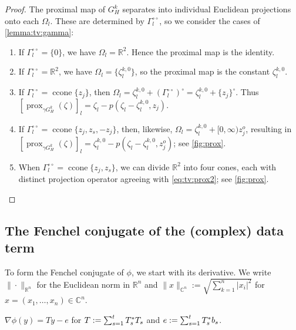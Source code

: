 \documentclass[a4paper,english]{jnsao}
\theoremstyle{definition}
\numberwithin{algorithm}{section}
\newcommand{\cj}[1]{\{ #1\}}
\newcommand{\proxold}[2]{\prox_{#1}(#2)}
\DeclareMathOperator{\prox}{prox}
\newcommand{\rea}[1]{\mathbb{R}^{#1}}
\def\norm#1{\|#1\|}
\def\defeq{:=}
\def\R{\mathbb{R}}
\def\C{\mathbb{C}}
\DeclareMathOperator{\ccone}{ccone}
\let\Re\relax\DeclareMathOperator{\Re}{Re}
\newcommand{\freevar}{\,\boldsymbol\cdot\,}
\def\abs#1{|#1|}
\def\polar#1{#1^\circ}
\def\bipolar#1{#1^{\circ\circ}}
\def\ortho{o}
\begin{document}
\begin{proof}
    The proximal map of $G_H^k$ separates into individual Euclidean projections onto each $\Omega_l$.
    These are determined by $\bipolar \Gamma_l$, so we consider the cases of \cref{lemma:tv:gamma}:
    \begin{enumerate}[label=(\alph*)]
        \item
        If $\bipolar \Gamma_l = \cj{0}$, we have $\Omega_l = \rea{2}$.
        Hence the proximal map is the identity.

        \item
        If $\bipolar \Gamma _l = \rea{2}$, we have $\Omega _l = \cj{\zeta _l^{k,0}}$, so the proximal map is the constant $\zeta _l^{k,0}$.

        \item
        If $\bipolar \Gamma_l = \ccone\cj{z_{j}}$, then
        $
            \Omega _l
             = \zeta_l^{k,0} + \polar{(\bipolar \Gamma_l)}
             = \zeta_l^{k,0} + \polar{\{z_j\}}.
        $
        Thus $[\proxold{\gamma G_H^k}{\zeta}]_l = \zeta _ l -p(\zeta _l - \zeta _l^{k,0},z_{j})$.

        \item
        If $\bipolar \Gamma _l = \ccone\cj{z_{j},z_{s},-z_{j}}$, then, likewise, $\Omega _l =  \zeta _l^{k,0} + [0, \infty) z_j^\ortho$, resulting in
        $[\proxold{\gamma G_H^k}{\zeta}]_l = \zeta _ l^{k,0} -p(\zeta _l - \zeta _l^{k,0},z_{j}^\ortho)$; see \cref{fig:prox}.

        \item
        When $\bipolar \Gamma_l = \ccone \cj{z_{j},z_{s}}$, we can divide $\R^2$ into four cones, each with distinct projection operator agreeing with \cref{eq:tv:prox2}; see \cref{fig:prox}.
        \qedhere
    \end{enumerate}
\end{proof}

\subsection{The Fenchel conjugate of the (complex) data term}
\label{sec:tv:data-fenchel}

To form the Fenchel conjugate of $\phi$, we start with its derivative.
We write $\norm{\freevar}_{\R^n}$ for the Euclidean norm in $\R^n$ and
$\norm{x}_{\C^n} \defeq \sqrt{\sum_{k=1}^n \abs{x_i}^2}$ for $x=(x_1,\ldots,x_n) \in \C^n$.

\begin{lemma}
    \label{lemma:tv:phi-derivative}
    $\nabla \phi (y) = Ty -e$ for $T \defeq \sum _{s=1}^t \Re T_s^*T_s$ and $e \defeq \sum _{s=1}^t \Re T_s^* b_s$.
\end{lemma}
\end{document}
